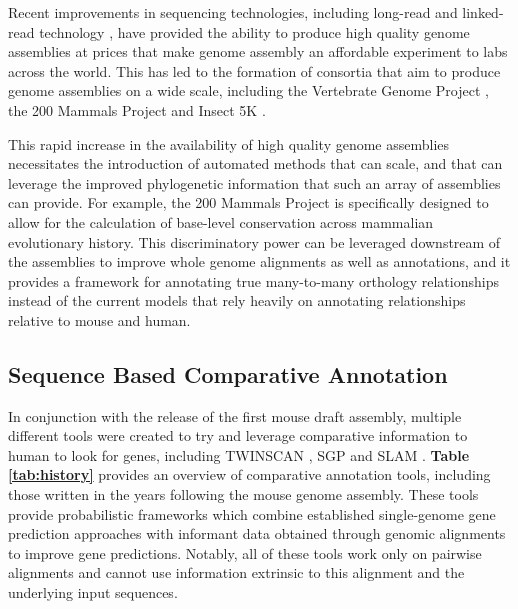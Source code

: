 \documentclass[fleqn,10pt]{wlscirep}
\begin{document}
Recent improvements in sequencing technologies, including long-read \cite{gordon2016long} and linked-read technology \cite{10xassembly}, have provided the ability to produce high quality genome assemblies at prices that make genome assembly an affordable experiment to labs across the world. This has led to the formation of consortia that aim to produce genome assemblies on a wide scale, including the Vertebrate Genome Project \cite{haussler2009genome}, the 200 Mammals Project and Insect 5K \cite{robinson2011creating}.

This rapid increase in the availability of high quality genome assemblies necessitates the introduction of automated methods that can scale, and that can leverage the improved phylogenetic information that such an array of assemblies can provide. For example, the 200 Mammals Project is specifically designed to allow for the calculation of base-level conservation across mammalian evolutionary history. This discriminatory power can be leveraged downstream of the assemblies to improve whole genome alignments as well as annotations, and it provides a framework for annotating true many-to-many orthology relationships instead of the current models that rely heavily on annotating relationships relative to mouse and human.

\subsection{Sequence Based Comparative Annotation}

In conjunction with the release of the first mouse draft assembly\cite{waterston2002initial}, multiple different tools were created to try and leverage comparative information to human to look for genes, including TWINSCAN \cite{flicek2003leveraging}, SGP \cite{wiehe2001sgp} and SLAM \cite{alexandersson2003slam}. \textbf{Table \ref{tab:history}} provides an overview of comparative annotation tools, including those written in the years following the mouse genome assembly. These tools provide probabilistic frameworks which combine established single-genome gene prediction approaches \cite{yeh2001computational,gelfand1996gene} with informant data obtained through genomic alignments to improve gene predictions. Notably, all of these tools work only on pairwise alignments and cannot use information extrinsic to this alignment and the underlying input sequences.
\end{document}

